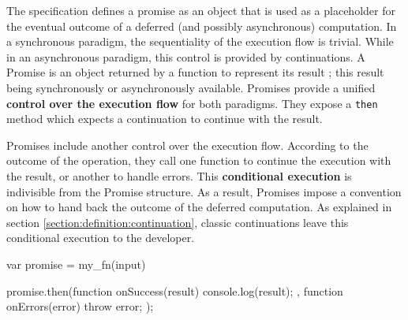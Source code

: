 
The specification defines a promise as an object that is used as a placeholder for the eventual outcome of a deferred (and possibly asynchronous) computation.
In a synchronous paradigm, the sequentiality of the execution flow is trivial.
While in an asynchronous paradigm, this control is provided by continuations.
A Promise is an object returned by a function to represent its result ; this result being synchronously or asynchronously available.
Promises provide a unified \textbf{control over the execution flow} for both paradigms.
They expose a \texttt{then} method which expects a continuation to continue with the result.


Promises include another control over the execution flow.
According to the outcome of the operation, they call one function to continue the execution with the result, or another to handle errors.
This \textbf{conditional execution} is indivisible from the Promise structure.
As a result, Promises impose a convention on how to hand back the outcome of the deferred computation.
As explained in section \ref{section:definition:continuation}, classic continuations leave this conditional execution to the developer.

\begin{code}[js, %
             caption={Example of a promise}, %
             label={lst:then}] %
var promise = my_fn(input)

promise.then(function onSuccess(result) {
  console.log(result);
}, function onErrors(error) {
  throw error;
});
\end{code}

